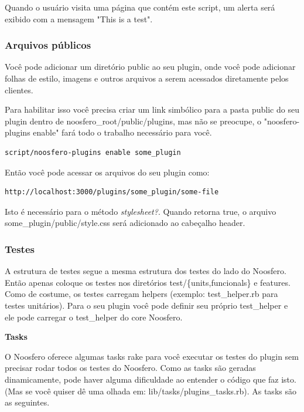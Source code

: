 \documentclass[11pt]{article}
\begin{document}
Quando o usuário visita uma página que contém este script, um alerta será
exibido com a mensagem "This is a test".

\subsubsection{Arquivos públicos}

Você pode adicionar um diretório public ao seu plugin, onde você pode
adicionar folhas de estilo, imagens e outros arquivos a serem acessados
diretamente pelos clientes.

Para habilitar isso você precisa criar um link simbólico para a pasta public
do seu plugin dentro de noosfero\_root/public/plugins, mas não se preocupe, o
"noosfero-plugins enable" fará todo o trabalho necessário para você.

\begin{Verbatim}[frame=single,fontfamily=courier]
script/noosfero-plugins enable some_plugin
\end{Verbatim}

Então você pode acessar os arquivos do seu plugin como:

\begin{Verbatim}[frame=single,fontfamily=courier]
http://localhost:3000/plugins/some_plugin/some-file
\end{Verbatim}

Isto é necessário para o método {\it stylesheet?}. Quando retorna true, o
arquivo some\_plugin/public/style.css será adicionado ao cabeçalho header.

\subsubsection{Testes}

A estrutura de testes segue a mesma estrutura dos testes do lado do Noosfero.
Então apenas coloque os testes nos diretórios test/\{units,funcionals\} e
features. Como de costume, os testes carregam helpers (exemplo: test\_helper.rb
para testes unitários). Para o seu plugin você pode definir seu próprio
test\_helper e ele pode carregar o test\_helper do core Noosfero.

{\bf Tasks}

O Noosfero oferece algumas tasks rake para você executar os testes do plugin sem
precisar rodar todos os testes do Noosfero. Como as tasks são geradas
dinamicamente, pode haver alguma dificuldade ao entender o código que faz
isto. (Mas se você quiser dê uma olhada em: lib/tasks/plugins\_tasks.rb). As
tasks são as seguintes.
\end{document}
